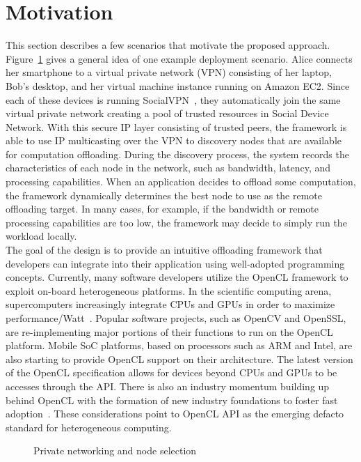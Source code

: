 \section{Motivation}
\label{intro:motivation}
This section describes a few scenarios that motivate the proposed
approach.
%
Figure~\ref{fig:motivation} gives a general idea of one example deployment scenario.
%
Alice connects her smartphone to a virtual private network (VPN)
consisting of her laptop, Bob's desktop, and her virtual machine
instance running on Amazon EC2.
%
Since each of these devices is running SocialVPN~\cite{socialvpn}, they
automatically join the same virtual private network creating a pool of
trusted resources in Social Device Network.
%
With this secure IP layer consisting of trusted peers, the framework is
able to use IP multicasting over the VPN to discovery nodes that are
available for computation offloading.
%
During the discovery process, the system records the characteristics of
each node in the network, such as bandwidth, latency, and processing
capabilities.
%
When an application decides to offload some computation, the framework
dynamically determines the best node to use as the remote offloading
target.
%
In many cases, for example, if the bandwidth or remote processing
capabilities are too low, the framework may decide to simply run the
workload locally.\\
%
The goal of the design is to provide an intuitive offloading framework
that developers can integrate into their application using well-adopted
programming concepts.
%
Currently, many software developers utilize the OpenCL framework to
exploit on-board heterogeneous platforms.
%
In the scientific computing arena, supercomputers increasingly integrate
CPUs and GPUs in order to maximize performance/Watt~\cite{powertutor}.
%
Popular software projects, such as OpenCV and OpenSSL, are
re-implementing major portions of their functions to run on the OpenCL
platform.
%
Mobile SoC platforms, based on processors such as ARM and Intel, are
also starting to provide OpenCL support on their architecture.
%
The latest version of the OpenCL specification allows for devices
beyond CPUs and GPUs to be accesses through the API.
%
There is also an industry momentum building up behind OpenCL with the
formation of new industry foundations to foster fast
adoption~\cite{hsa}.
%
These considerations point to OpenCL API as the emerging defacto
standard for heterogeneous computing.\\
%
\begin{figure}
\centering
{}
\caption{Private networking and node selection}
\label{fig:motivation}
\end{figure}
